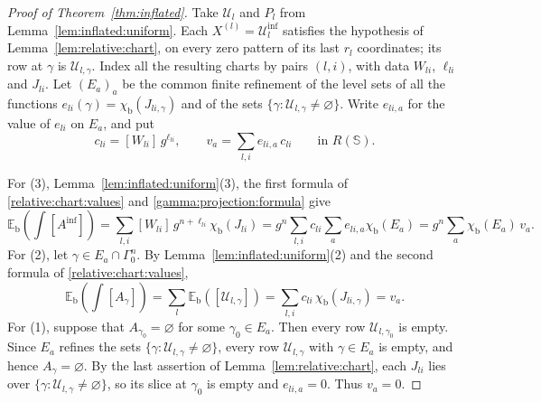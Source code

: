 \begin{proof}[Proof of Theorem~\ref{thm:inflated}]
Take $\mathcal U_l$ and $P_l$ from Lemma~\ref{lem:inflated:uniform}. Each
$X^{(l)}=\mathcal U_l^{\mathrm{inf}}$ satisfies the hypothesis of
Lemma~\ref{lem:relative:chart}, on every zero pattern of its last $r_l$
coordinates; its row at $\gamma$ is $\mathcal U_{l,\gamma}$. Index all the
resulting charts by pairs $(l,i)$, with data $W_{li}$, $\ell_{li}$ and
$J_{li}$. Let $(E_a)_a$ be the common finite refinement of the level sets of
all the functions $e_{li}(\gamma)=\chi_{\mathrm b}(J_{li,\gamma})$ and of the
sets $\{\gamma:\mathcal U_{l,\gamma}\neq\varnothing\}$. Write $e_{li,a}$ for
the value of $e_{li}$ on $E_a$, and put
\[
 c_{li}=[W_{li}]\,g^{\ell_{li}},\qquad
 v_a=\sum_{l,i}e_{li,a}\,c_{li}\qquad\text{in }R(\mathbb S).
\]

For (3), Lemma~\ref{lem:inflated:uniform}(3), the first formula of
\eqref{relative:chart:values} and \eqref{gamma:projection:formula} give
\[
 \mathbb E_{\mathrm b}\!\left(\int[A^{\mathrm{inf}}]\right)
 =\sum_{l,i}[W_{li}]\,g^{n+\ell_{li}}\chi_{\mathrm b}(J_{li})
 =g^n\sum_{l,i}c_{li}\sum_ae_{li,a}\chi_{\mathrm b}(E_a)
 =g^n\sum_a\chi_{\mathrm b}(E_a)\,v_a .
\]
For (2), let $\gamma\in E_a\cap\Gamma_0^n$. By
Lemma~\ref{lem:inflated:uniform}(2) and the second formula of
\eqref{relative:chart:values},
\[
 \mathbb E_{\mathrm b}\!\left(\int[A_\gamma]\right)
 =\sum_l\mathbb E_{\mathrm b}([\mathcal U_{l,\gamma}])
 =\sum_{l,i}c_{li}\,\chi_{\mathrm b}(J_{li,\gamma})
 =v_a .
\]
For (1), suppose that $A_{\gamma_0}=\varnothing$ for some $\gamma_0\in E_a$.
Then every row $\mathcal U_{l,\gamma_0}$ is empty. Since $E_a$ refines the
sets $\{\gamma:\mathcal U_{l,\gamma}\neq\varnothing\}$, every row
$\mathcal U_{l,\gamma}$ with $\gamma\in E_a$ is empty, and hence
$A_\gamma=\varnothing$. By the last assertion of
Lemma~\ref{lem:relative:chart}, each $J_{li}$ lies over
$\{\gamma:\mathcal U_{l,\gamma}\neq\varnothing\}$, so its slice at $\gamma_0$
is empty and $e_{li,a}=0$. Thus $v_a=0$.
\end{proof}
